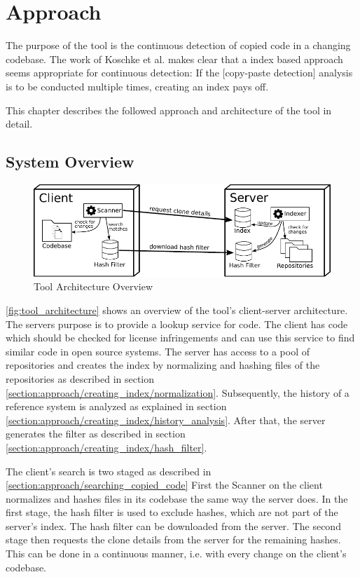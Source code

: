 
\chapter{Approach}\label{chapter:approach}
The purpose of the tool is the continuous detection of copied code in a changing codebase.
The work of Koschke et al. makes clear that a index based approach seems appropriate for continuous detection:
\glqq If the [copy-paste detection] analysis is to be conducted multiple times, creating an index pays off\grqq \cite{koschke2014large}.

This chapter describes the followed approach and architecture of the tool in detail.

\section{System Overview}
\begin{figure}[h]
	\centering
	\includegraphics{figures/architecture_overview.pdf}
	\caption{Tool Architecture Overview}\label{fig:tool_architecture}
\end{figure}
\autoref{fig:tool_architecture} shows an overview of the tool's client-server architecture.
The servers purpose is to provide a lookup service for code.
The client has code which should be checked for license infringements and can use this service to find similar code in open source systems.
The server has access to a pool of repositories and creates the index by normalizing and hashing files of the repositories as described in section \ref{section:approach/creating_index/normalization}.
Subsequently, the history of a reference system is analyzed as explained in section \ref{section:approach/creating_index/history_analysis}.
After that, the server generates the filter as described in section \ref{section:approach/creating_index/hash_filter}.

The client's search is two staged as described in \autoref{section:approach/searching_copied_code}
First the Scanner on the client normalizes and hashes files in its codebase the same way the server does.
In the first stage, the hash filter is used to exclude hashes, which are not part of the server's index.
The hash filter can be downloaded from the server.
The second stage then requests the clone details from the server for the remaining hashes.
This can be done in a continuous manner, i.e. with every change on the client's codebase.

